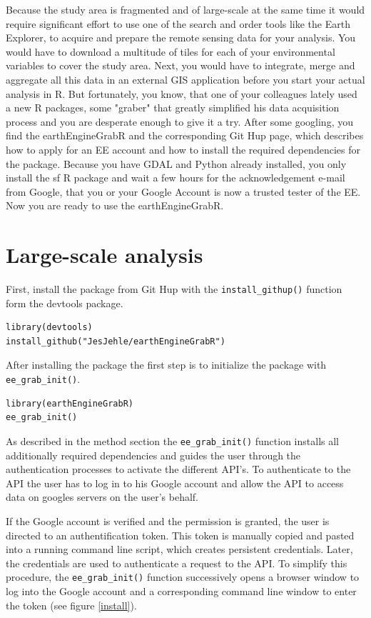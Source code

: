 Because the study area is fragmented and of large-scale at the same time it would require significant effort to use one of the search and order tools like the Earth Explorer, to acquire and prepare the remote sensing data for your analysis. You would have to download a multitude of tiles for each of your environmental variables to cover the study area. Next, you would have to integrate, merge and aggregate all this data in an external GIS application before you start your actual analysis in R. But fortunately, you know, that one of your colleagues lately used a new R packages, some "graber" that greatly simplified his data acquisition process and you are desperate enough to give it a try. After some googling, you find the earthEngineGrabR and the corresponding Git Hup page, which describes how to apply for an EE account and how to install the required dependencies for the package. Because you have GDAL and Python already installed, you only install the sf R package and wait a few hours for the acknowledgement e-mail from Google, that you or your Google Account is now a trusted tester of the EE. Now you are ready to use the earthEngineGrabR.

\section{Large-scale analysis}

First, install the package from Git Hup with the \texttt{install\_githup()} function form the devtools package.

\begin{lstlisting}
library(devtools)
install_github("JesJehle/earthEngineGrabR")
\end{lstlisting}

After installing the package the first step is to initialize the package with \texttt{ee\_grab\_init()}. 

\begin{lstlisting}
library(earthEngineGrabR)
ee_grab_init()
\end{lstlisting}

As described in the method section the \texttt{ee\_grab\_init()} function installs all additionally required dependencies and guides the user through the authentication processes to activate the different API's. To authenticate to the API the user has to log in to his Google account and allow the API to access data on googles servers on the user's behalf. 


If the Google account is verified and the permission is granted, the user is directed to an authentification token. This token is manually copied and pasted into a running command line script, which creates persistent credentials. Later, the credentials are used to authenticate a request to the API. To simplify this procedure, the \texttt{ee\_grab\_init()} function successively opens a browser window to log into the Google account and a corresponding command line window to enter the token (see figure \ref{install}). 

